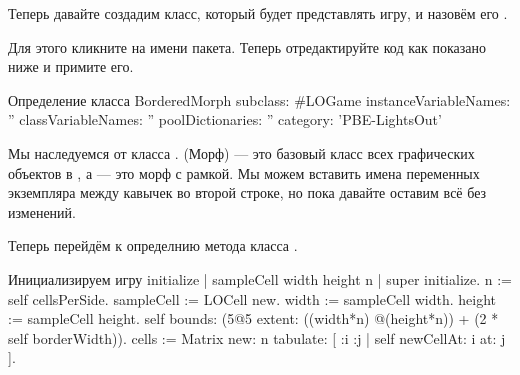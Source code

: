 \documentclass[a4paper,10pt,twoside]{book}
\begin{document}
Теперь давайте создадим класс, который будет представлять игру, и назовём его .

Для этого кликните на имени пакета.
Теперь отредактируйте код как показано ниже и примите его.

\begin{classdef}[sbegame]{Определение класса }
BorderedMorph subclass: #LOGame
   instanceVariableNames: ''
   classVariableNames: ''
   poolDictionaries: ''
   category: 'PBE-LightsOut'
\end{classdef}

Мы наследуемся от класса .  (Морф) --- это базовый класс всех графических объектов в \pharo, а  --- это морф с рамкой.
Мы можем вставить имена переменных экземпляра между кавычек во второй строке, но пока давайте оставим всё без изменений.

Теперь перейдём к определнию метода  класса .


\begin{numMethod}[sbegameinitialize]{Инициализируем игру}
initialize
   | sampleCell width height n |
   super initialize.
   n := self cellsPerSide.
   sampleCell := LOCell new.
   width := sampleCell width.
   height := sampleCell height.
   self bounds: (5@5 extent: ((width*n) @(height*n)) + (2 * self borderWidth)).
   cells := Matrix new: n tabulate: [ :i :j | self newCellAt: i at: j ].
\end{numMethod}
\end{document}
